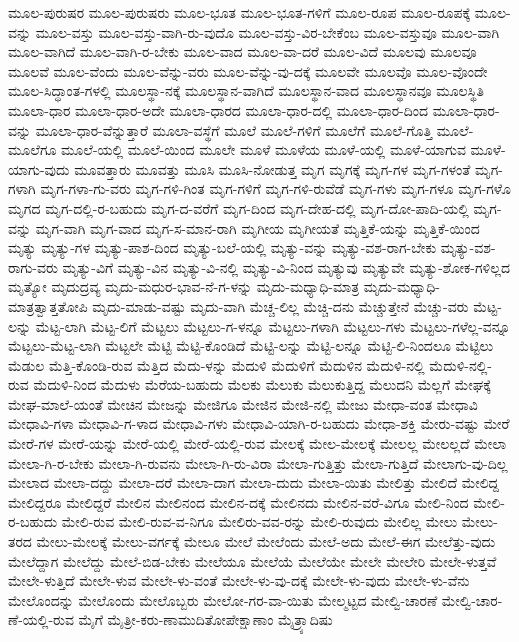 {ಮೂಲ-ಪುರುಷರ
ಮೂಲ-ಪುರುಷರು
ಮೂಲ-ಭೂತ
ಮೂಲ-ಭೂತ-ಗಳಿಗೆ
ಮೂಲ-ರೂಪ
ಮೂಲ-ರೂಪಕ್ಕೆ
ಮೂಲ-ವನ್ನು
ಮೂಲ-ವಸ್ತು
ಮೂಲ-ವಸ್ತು-ವಾಗಿ-ರು-ವುದೊ
ಮೂಲ-ವಸ್ತು-ವಿರ-ಬೇಕೆಂಬ
ಮೂಲ-ವಸ್ತುವೂ
ಮೂಲ-ವಾಗಿ
ಮೂಲ-ವಾಗಿದೆ
ಮೂಲ-ವಾಗಿ-ರ-ಬೇಕು
ಮೂಲ-ವಾದ
ಮೂಲ-ವಾ-ದರೆ
ಮೂಲ-ವಿದೆ
ಮೂಲವು
ಮೂಲವೂ
ಮೂಲವೆ
ಮೂಲ-ವೆಂದು
ಮೂಲ-ವೆನ್ನು-ವರು
ಮೂಲ-ವೆನ್ನು-ವು-ದಕ್ಕೆ
ಮೂಲವೇ
ಮೂಲವೊ
ಮೂಲ-ವೊಂದೇ
ಮೂಲ-ಸಿದ್ಧಾಂತ-ಗಳಲ್ಲಿ
ಮೂಲಸ್ಥಾ-ನಕ್ಕೆ
ಮೂಲಸ್ಥಾನ-ವಾಗಿದೆ
ಮೂಲಸ್ಥಾನ-ವಾದ
ಮೂಲಸ್ಥಾನವೂ
ಮೂಲಸ್ಥಿತಿ
ಮೂಲಾ-ಧಾರ
ಮೂಲಾ-ಧಾರ-ಅದೇ
ಮೂಲಾ-ಧಾರದ
ಮೂಲಾ-ಧಾರ-ದಲ್ಲಿ
ಮೂಲಾ-ಧಾರ-ದಿಂದ
ಮೂಲಾ-ಧಾರ-ವನ್ನು
ಮೂಲಾ-ಧಾರ-ವೆನ್ನುತ್ತಾರೆ
ಮೂಲಾ-ವಸ್ಥೆಗೆ
ಮೂಲೆ
ಮೂಲೆ-ಗಳಿಗೆ
ಮೂಲೆಗೆ
ಮೂಲೆ-ಗೊತ್ತಿ
ಮೂಲೆ-ಮೂಲೆಗೂ
ಮೂಲೆ-ಯಲ್ಲಿ
ಮೂಲೆ-ಯಿಂದ
ಮೂಲೇ
ಮೂಳೆ
ಮೂಳೆಯ
ಮೂಳೆ-ಯಲ್ಲಿ
ಮೂಳೆ-ಯಾಗುವ
ಮೂಳೆ-ಯಾಗು-ವುದು
ಮೂವತ್ತಾರು
ಮೂವತ್ತು
ಮೂಸಿ
ಮೂಸಿ-ನೋಡುತ್ತ
ಮೃಗ
ಮೃಗಕ್ಕೆ
ಮೃಗ-ಗಳ
ಮೃಗ-ಗಳಂತೆ
ಮೃಗ-ಗಳಾಗಿ
ಮೃಗ-ಗಳಾ-ಗು-ವರು
ಮೃಗ-ಗಳಿ-ಗಿಂತ
ಮೃಗ-ಗಳಿಗೆ
ಮೃಗ-ಗಳಿ-ರುವೆಡೆ
ಮೃಗ-ಗಳು
ಮೃಗ-ಗಳೂ
ಮೃಗ-ಗಳೊ
ಮೃಗದ
ಮೃಗ-ದಲ್ಲಿ-ರ-ಬಹುದು
ಮೃಗ-ದ-ವರೆಗೆ
ಮೃಗ-ದಿಂದ
ಮೃಗ-ದೇಹ-ದಲ್ಲಿ
ಮೃಗ-ದೋ-ಪಾದಿ-ಯಲ್ಲಿ
ಮೃಗ-ವನ್ನು
ಮೃಗ-ವಾಗಿ
ಮೃಗ-ವಾದ
ಮೃಗ-ಸ-ಮಾನ-ರಾಗಿ
ಮೃಗೀಯ
ಮೃಗೀಯತೆ
ಮೃತ್ತಿಕೆ-ಯನ್ನು
ಮೃತ್ತಿಕೆ-ಯಿಂದ
ಮೃತ್ಯು
ಮೃತ್ಯು-ಗಳ
ಮೃತ್ಯು-ಪಾಶ-ದಿಂದ
ಮೃತ್ಯು-ಬಲೆ-ಯಲ್ಲಿ
ಮೃತ್ಯು-ವನ್ನು
ಮೃತ್ಯು-ವಶ-ರಾಗ-ಬೇಕು
ಮೃತ್ಯು-ವಶ-ರಾಗು-ವರು
ಮೃತ್ಯು-ವಿಗೆ
ಮೃತ್ಯು-ವಿನ
ಮೃತ್ಯು-ವಿ-ನಲ್ಲಿ
ಮೃತ್ಯು-ವಿ-ನಿಂದ
ಮೃತ್ಯುವು
ಮೃತ್ಯುವೇ
ಮೃತ್ಯು-ಶೋಕ-ಗಳಿಲ್ಲದ
ಮೃತ್ಯೋ
ಮೃದುದ್ರವ್ಯ
ಮೃದು-ಮಧುರ-ಭಾವ-ನೆ-ಗ-ಳನ್ನು
ಮೃದು-ಮಧ್ಯಾಧಿ-ಮಾತ್ರ
ಮೃದು-ಮಧ್ಯಾಧಿ-ಮಾತ್ರತ್ವಾತ್ತತೋಪಿ
ಮೃದು-ಮಾಡು-ವಷ್ಟು
ಮೃದು-ವಾಗಿ
ಮೆಚ್ಚ-ಲಿಲ್ಲ
ಮೆಚ್ಚಿ-ದನು
ಮೆಚ್ಚುತ್ತೇನೆ
ಮೆಚ್ಚು-ವರು
ಮೆಟ್ಟ-ಲನ್ನು
ಮೆಟ್ಟ-ಲಾಗಿ
ಮೆಟ್ಟ-ಲಿಗೆ
ಮೆಟ್ಟಲು
ಮೆಟ್ಟಲು-ಗ-ಳನ್ನೂ
ಮೆಟ್ಟಲು-ಗಳಾಗಿ
ಮೆಟ್ಟಲು-ಗಳು
ಮೆಟ್ಟಲು-ಗಳೆಲ್ಲ-ವನ್ನೂ
ಮೆಟ್ಟಲು-ಮೆಟ್ಟ-ಲಾಗಿ
ಮೆಟ್ಟಲೇ
ಮೆಟ್ಟಿ
ಮೆಟ್ಟಿ-ಕೊಂಡಿದೆ
ಮೆಟ್ಟಿ-ಲನ್ನು
ಮೆಟ್ಟಿ-ಲನ್ನೂ
ಮೆಟ್ಟಿ-ಲಿ-ನಿಂದಲೂ
ಮೆಟ್ಟಿಲು
ಮೆಡುಲ
ಮೆತ್ತಿ-ಕೊಂಡಿ-ರುವ
ಮೆತ್ತಿದ
ಮೆದು-ಳನ್ನು
ಮೆದುಳಿ
ಮೆದುಳಿಗೆ
ಮೆದುಳಿನ
ಮೆದುಳಿ-ನಲ್ಲಿ
ಮೆದುಳಿ-ನಲ್ಲಿ-ರುವ
ಮೆದುಳಿ-ನಿಂದ
ಮೆದುಳು
ಮೆರೆಯ-ಬಹುದು
ಮೆಲಕು
ಮೆಲುಕು
ಮೆಲುಕುತ್ತಿದ್ದ
ಮೆಲುದನಿ
ಮೆಲ್ಲಗೆ
ಮೇಘಕ್ಕೆ
ಮೇಘ-ಮಾಲೆ-ಯಂತೆ
ಮೇಚಿನ
ಮೇಜನ್ನು
ಮೇಜಿಗೂ
ಮೇಜಿನ
ಮೇಜಿ-ನಲ್ಲಿ
ಮೇಜು
ಮೇಧಾ-ವಂತ
ಮೇಧಾವಿ
ಮೇಧಾವಿ-ಗಳಾ
ಮೇಧಾವಿ-ಗ-ಳಾದ
ಮೇಧಾವಿ-ಗಳು
ಮೇಧಾವಿ-ಯಾಗಿ-ರ-ಬಹುದು
ಮೇಧಾ-ಶಕ್ತಿ
ಮೇರು-ವಷ್ಟು
ಮೇರೆ
ಮೇರೆ-ಗಳ
ಮೇರೆ-ಯನ್ನು
ಮೇರೆ-ಯಲ್ಲಿ
ಮೇರೆ-ಯಲ್ಲಿ-ರುವ
ಮೇಲಕ್ಕೆ
ಮೇಲ-ಮೇಲಕ್ಕೆ
ಮೇಲಲ್ಲ
ಮೇಲಲ್ಲದೆ
ಮೇಲಾ
ಮೇಲಾ-ಗಿ-ರ-ಬೇಕು
ಮೇಲಾ-ಗಿ-ರುವನು
ಮೇಲಾ-ಗಿ-ರು-ವಿರಾ
ಮೇಲಾ-ಗುತ್ತಿತ್ತು
ಮೇಲಾ-ಗುತ್ತಿದೆ
ಮೇಲಾಗು-ವು-ದಿಲ್ಲ
ಮೇಲಾದ
ಮೇಲಾ-ದದ್ದು
ಮೇಲಾ-ದರೆ
ಮೇಲಾ-ದಾಗ
ಮೇಲಾ-ದುದು
ಮೇಲಾ-ಯಿತು
ಮೇಲಿತ್ತು
ಮೇಲಿದೆ
ಮೇಲಿದ್ದ
ಮೇಲಿದ್ದರೂ
ಮೇಲಿದ್ದರೆ
ಮೇಲಿನ
ಮೇಲಿನಂದ
ಮೇಲಿನ-ದಕ್ಕೆ
ಮೇಲಿನದು
ಮೇಲಿನ-ವರೆ-ವಿಗೂ
ಮೇಲಿ-ನಿಂದ
ಮೇಲಿ-ರ-ಬಹುದು
ಮೇಲಿ-ರುವ
ಮೇಲಿ-ರುವ-ವ-ನಿಗೂ
ಮೇಲಿರು-ವವ-ರನ್ನು
ಮೇಲಿ-ರುವುದು
ಮೇಲಿಲ್ಲ
ಮೇಲು
ಮೇಲು-ತರದ
ಮೇಲು-ಮೇಲಕ್ಕೆ
ಮೇಲು-ವರ್ಗಕ್ಕೆ
ಮೇಲೂ
ಮೇಲೆ
ಮೇಲೆಂದು
ಮೇಲೆ-ಅದು
ಮೇಲೆ-ಈಗ
ಮೇಲೆತ್ತು-ವುದು
ಮೇಲೆದ್ದಾಗ
ಮೇಲೆದ್ದು
ಮೇಲೆ-ಬಿಡ-ಬೇಕು
ಮೇಲೆಯೂ
ಮೇಲೆಯೆ
ಮೇಲೆಯೇ
ಮೇಲೇ
ಮೇಲೇರಿ
ಮೇಲೇ-ಳುತ್ತವೆ
ಮೇಲೇ-ಳುತ್ತಿದೆ
ಮೇಲೇ-ಳುವ
ಮೇಲೇ-ಳು-ವಂತೆ
ಮೇಲೇ-ಳು-ವು-ದಕ್ಕೆ
ಮೇಲೇ-ಳು-ವುದು
ಮೇಲೇ-ಳು-ವೆನು
ಮೇಲೊಂದನ್ನು
ಮೇಲೊಂದು
ಮೇಲೊಬ್ಬರು
ಮೇಲೋ-ಗರ-ವಾ-ಯಿತು
ಮೇಲ್ಮಟ್ಟದ
ಮೇಲ್ವಿ-ಚಾರಣೆ
ಮೇಲ್ವಿ-ಚಾರ-ಣೆ-ಯಲ್ಲಿ-ರುವ
ಮೈಗೆ
ಮೈತ್ರೀ-ಕರು-ಣಾಮುದಿತೋಪೇಕ್ಷಾಣಾಂ
ಮೈತ್ರ್ಯಾದಿಷು
}
